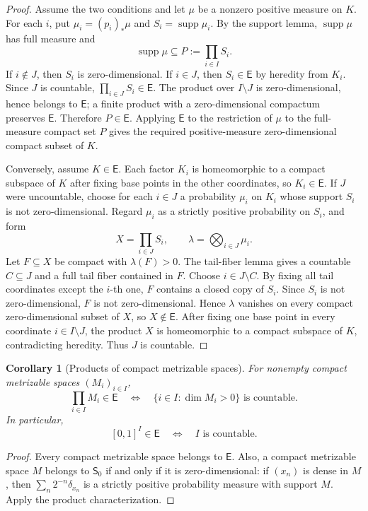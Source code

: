 \documentclass[11pt]{article}
\newtheorem{corollary}{Corollary}
\newcommand{\E}{\mathsf E}
\newcommand{\Szero}{\mathsf S_0}
\newcommand{\supp}{\operatorname{supp}}
\begin{document}
\begin{proof}
Assume the two conditions and let \(\mu\) be a nonzero positive measure on \(K\).
For each \(i\), put \(\mu_i=(p_i)_*\mu\) and \(S_i=\supp\mu_i\).  By the support
lemma, \(\supp\mu\) has full measure and
\[
  \supp\mu\subseteq P:=\prod_{i\in I}S_i .
\]
If \(i\notin J\), then \(S_i\) is zero-dimensional.  If \(i\in J\), then
\(S_i\in\E\) by heredity from \(K_i\).  Since \(J\) is countable,
\(\prod_{i\in J}S_i\in\E\).  The product over \(I\setminus J\) is
zero-dimensional, hence belongs to \(\E\); a finite product with a
zero-dimensional compactum preserves \(\E\).  Therefore \(P\in\E\).  Applying
\(\E\) to the restriction of \(\mu\) to the full-measure compact set \(P\) gives
the required positive-measure zero-dimensional compact subset of \(K\).

Conversely, assume \(K\in\E\).  Each factor \(K_i\) is homeomorphic to a compact
subspace of \(K\) after fixing base points in the other coordinates, so
\(K_i\in\E\).  If \(J\) were uncountable, choose for each \(i\in J\) a
probability \(\mu_i\) on \(K_i\) whose support \(S_i\) is not zero-dimensional.
Regard \(\mu_i\) as a strictly positive probability on \(S_i\), and form
\[
  X=\prod_{i\in J}S_i,\qquad \lambda=\bigotimes_{i\in J}\mu_i .
\]
Let \(F\subseteq X\) be compact with \(\lambda(F)>0\).  The tail-fiber lemma
gives a countable \(C\subseteq J\) and a full tail fiber contained in \(F\).
Choose \(i\in J\setminus C\).  By fixing all tail coordinates except the
\(i\)-th one, \(F\) contains a closed copy of \(S_i\).  Since \(S_i\) is not
zero-dimensional, \(F\) is not zero-dimensional.  Hence \(\lambda\) vanishes on
every compact zero-dimensional subset of \(X\), so \(X\notin\E\).  After fixing
one base point in every coordinate \(i\in I\setminus J\), the product \(X\) is
homeomorphic to a compact subspace of \(K\), contradicting heredity.  Thus \(J\)
is countable.
\end{proof}

\begin{corollary}[Products of compact metrizable spaces]
For nonempty compact metrizable spaces \((M_i)_{i\in I}\),
\[
  \prod_{i\in I}M_i\in\E
  \quad\Longleftrightarrow\quad
  \{i\in I:\dim M_i>0\}\text{ is countable}.
\]
In particular,
\[
  [0,1]^I\in\E \quad\Longleftrightarrow\quad I\text{ is countable}.
\]
\end{corollary}

\begin{proof}
Every compact metrizable space belongs to \(\E\).  Also, a compact metrizable
space \(M\) belongs to \(\Szero\) if and only if it is zero-dimensional: if
\((x_n)\) is dense in \(M\), then \(\sum_n2^{-n}\delta_{x_n}\) is a strictly
positive probability measure with support \(M\).  Apply the product
characterization.
\end{proof}
\end{document}
